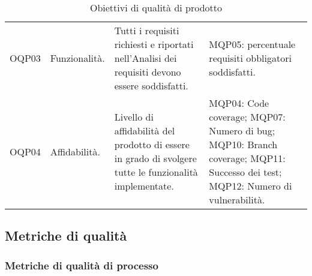\begin{table}[H]
\begin{tabular}{ m{}<{\centering}  m{}<{\centering}  m{}<{\centering}  m{}<{\centering} }
		\rowcolor{gray!25}        
        OQP03 &
        Funzionalità. &
        Tutti i requisiti richiesti e riportati nell'Analisi dei requisiti devono essere soddisfatti. &
        MQP05: percentuale requisiti obbligatori soddisfatti. \\

		\rowcolor{gray!00}
        OQP04 &
        Affidabilità. &
        Livello di affidabilità del prodotto di essere in grado di svolgere tutte le funzionalità implementate. &
        MQP04: Code coverage; \newline
        MQP07: Numero di bug; \newline
        MQP10: Branch coverage; \newline
        MQP11: Successo dei test; \newline
        MQP12: Numero di vulnerabilità. \\

    \end{tabular}
    \caption{Obiettivi di qualità di prodotto}
\end{table}

\subsection{Metriche di qualità}

\subsubsection{Metriche di qualità di processo}


